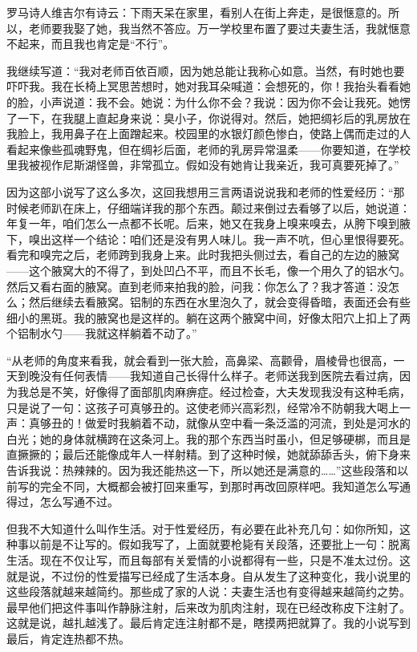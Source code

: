 罗马诗人维吉尔有诗云：下雨天呆在家里，看别人在街上奔走，是很惬意的。所以，老师要我娶了她，我当然不答应。万一学校里布置了要过夫妻生活，我就惬意不起来，而且我也肯定是“不行”。 

我继续写道：“我对老师百依百顺，因为她总能让我称心如意。当然，有时她也要吓吓我。我在长椅上冥思苦想时，她对我耳朵喊道：会想死的，你！我抬头看看她的脸，小声说道：我不会。她说：为什么你不会？我说：因为你不会让我死。她愣了一下，在我腿上直起身来说：臭小子，你说得对。然后，她把绸衫后的乳房放在我脸上，我用鼻子在上面蹭起来。校园里的水银灯颜色惨白，使路上偶而走过的人看起来像些孤魂野鬼，但在绸衫后面，老师的乳房异常温柔——你要知道，在学校里我被视作尼斯湖怪兽，非常孤立。假如没有她肯让我亲近，我可真要死掉了。” 

因为这部小说写了这么多次，这回我想用三言两语说说我和老师的性爱经历：“那时候老师趴在床上，仔细端详我的那个东西。颠过来倒过去看够了以后，她说道：年复一年，咱们怎么一点都不长呢。后来，她又在我身上嗅来嗅去，从胯下嗅到腋下，嗅出这样一个结论：咱们还是没有男人味儿。我一声不吭，但心里恨得要死。看完和嗅完之后，老师跨到我身上来。此时我把头侧过去，看自己的左边的腋窝——这个腋窝大的不得了，到处凹凸不平，而且不长毛，像一个用久了的铝水勺。然后又看右面的腋窝。直到老师来拍我的脸，问我：你怎么了？我才答道：没怎么；然后继续去看腋窝。铝制的东西在水里泡久了，就会变得昏暗，表面还会有些细小的黑斑。我的腋窝也是这样的。躺在这两个腋窝中间，好像太阳穴上扣上了两个铝制水勺——我就这样躺着不动了。” 

“从老师的角度来看我，就会看到一张大脸，高鼻梁、高颧骨，眉棱骨也很高，一天到晚没有任何表情——我知道自己长得什么样子。老师送我到医院去看过病，因为我总是不笑，好像得了面部肌肉麻痹症。经过检查，大夫发现我没有这种毛病，只是说了一句：这孩子可真够丑的。这使老师兴高彩烈，经常冷不防朝我大喝上一声：真够丑的！做爱时我躺着不动，就像从空中看一条泛滥的河流，到处是河水的白光；她的身体就横跨在这条河上。我的那个东西当时虽小，但足够硬梆，而且是直撅撅的；最后还能像成年人一样射精。到了这种时候，她就舔舔舌头，俯下身来告诉我说：热辣辣的。因为我还能热这一下，所以她还是满意的……”这些段落和以前写的完全不同，大概都会被打回来重写，到那时再改回原样吧。我知道怎么写通得过，怎么写通不过。 

但我不大知道什么叫作生活。对于性爱经历，有必要在此补充几句：如你所知，这种事以前是不让写的。假如我写了，上面就要枪毙有关段落，还要批上一句：脱离生活。现在不仅让写，而且每部有关爱情的小说都得有一些，只是不准太过份。这就是说，不过份的性爱描写已经成了生活本身。自从发生了这种变化，我小说里的这些段落就越来越简约。那些成了家的人说：夫妻生活也有变得越来越简约之势。最早他们把这件事叫作静脉注射，后来改为肌肉注射，现在已经改称皮下注射了。这就是说，越扎越浅了。最后肯定连注射都不是，瞎摸两把就算了。我的小说写到最后，肯定连热都不热。 
